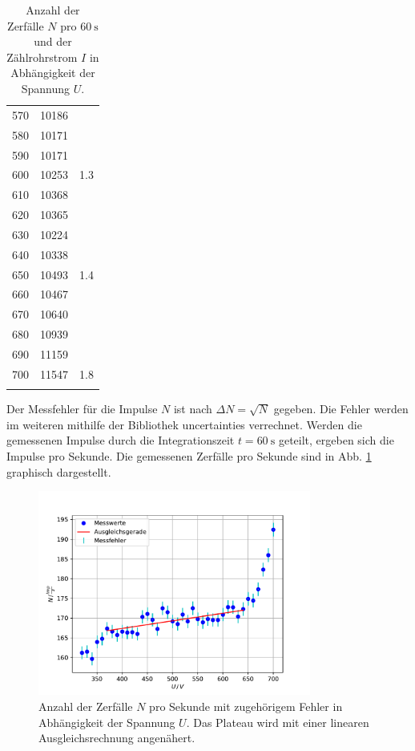 \begin{table}
\begin{tabular}{ccc}
    570 & 10186 \\
    580 & 10171 \\
    590 & 10171 \\
    600 & 10253 & 1.3 \\
    610 & 10368 \\
    620 & 10365 \\
    630 & 10224 \\
    640 & 10338 \\
    650 & 10493 & 1.4\\
    660 & 10467 \\
    670 & 10640 \\
    680 & 10939 \\
    690 & 11159 \\
    700 & 11547 & 1.8 \\
        &       \\
    \bottomrule
    \end{tabular}
    \caption{Anzahl der Zerfälle $N$ pro $\SI{60}{\second}$ und der Zählrohrstrom $I$ in Abhängigkeit der Spannung $U$.}
    \label{tab:charakteristik}
\end{table}
Der Messfehler für die Impulse $N$ ist nach $\Delta N = \sqrt{N}$ gegeben.
Die Fehler werden im weiteren mithilfe der Bibliothek \glqq uncertainties\grqq \cite{uncertainties} verrechnet.
Werden die gemessenen Impulse durch die Integrationszeit $t = \SI{60}{\second}$  geteilt, ergeben sich die Impulse pro Sekunde.
Die gemessenen Zerfälle pro Sekunde sind in Abb. \ref{fig:char_plot} graphisch dargestellt.
\begin{figure}
    \centering
    \includegraphics[width=0.8\textwidth]{content/data/charakteristik.pdf}
    \caption{Anzahl der Zerfälle $N$ pro Sekunde mit zugehörigem Fehler in Abhängigkeit der Spannung $U$. Das Plateau wird mit einer linearen Ausgleichsrechnung angenähert. \cite{matplotlib} \cite{scipy} \cite{uncertainties} \cite{numpy}}
    \label{fig:char_plot}
\end{figure}
